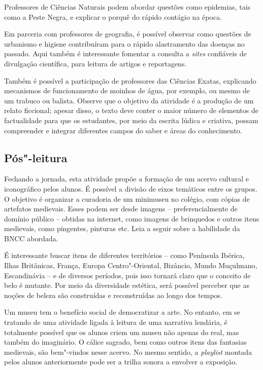 \documentclass[11pt]{extarticle}
\begin{document}
Professores de Ciências Naturais podem abordar questões como epidemias,
tais como a Peste Negra, e explicar o porquê do rápido contágio na
época. 

Em parceria com professores de geografia, é possível observar
como questões de urbanismo e higiene contribuíram para o rápido
alastramento das doenças no passado. Aqui também é interessante fomentar
a consulta a \emph{sites} confiáveis de divulgação científica, para
leitura de artigos e reportagens.

Também é possível a participação de professores das Ciências Exatas,
explicando mecanismos de funcionamento de moinhos de água, por exemplo,
ou mesmo de um trabuco ou balista. Observe que o objetivo da atividade é
a produção de um relato ficcional; apesar disso, o texto deve conter o
maior número de elementos de factualidade para que os estudantes, por
meio da escrita lúdica e criativa, possam compreender e integrar
diferentes campos do saber e áreas do conhecimento.

\subsection{Pós"-leitura}

Fechando a jornada, esta atividade propõe a formação de um
acervo cultural e iconográfico pelos alunos. É possível a divisão de
eixos temáticos entre os grupos. O objetivo é organizar a curadoria de
um minimuseu no colégio, com cópias de artefatos medievais. Esses podem
ser desde imagens -- preferencialmente de domínio público -- obtidas na
internet, como imagens de brinquedos e outros itens medievais, como
pingentes, pinturas etc. Leia a seguir sobre a habilidade da BNCC abordada.

É interessante buscar itens de diferentes territórios -- como Península
Ibérica, Ilhas Britânicas, França, Europa Centro"-Oriental, Bizâncio,
Mundo Muçulmano, Escandinávia -- e de diversos períodos, pois isso
tornará claro que o conceito de belo é mutante. Por meio da diversidade
estética, será possível perceber que as noções de beleza são construídas
e reconstruídas ao longo dos tempos.

Um museu tem o benefício social de democratizar a arte. No
entanto, em se tratando de uma atividade ligada à leitura de uma
narrativa lendária, é totalmente possível que os alunos criem um museu
não apenas do real, mas também do imaginário. O cálice sagrado, bem como
outros itens das fantasias medievais, são bem"-vindos nesse acervo. No
mesmo sentido, a \emph{playlist} montada pelos alunos anteriormente pode
ser a trilha sonora a envolver a exposição.
\end{document}
